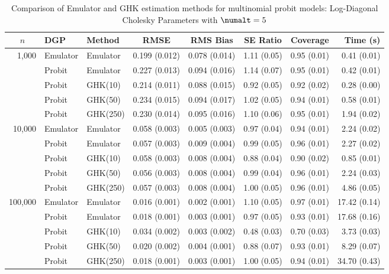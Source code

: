 \begin{table}[htbp]
\centering
\footnotesize
\begin{tabular}{@{}rllrrrrr@{}}
\toprule
\multicolumn{1}{c}{$n$} & \multicolumn{1}{l}{DGP} & \multicolumn{1}{l}{Method} & \multicolumn{1}{c}{RMSE} & \multicolumn{1}{c}{RMS Bias} & \multicolumn{1}{c}{SE Ratio} & \multicolumn{1}{c}{Coverage} & \multicolumn{1}{r}{Time (s)} \\
\midrule
\multirow{5}{*}{1,000} & Emulator & Emulator & 0.199 (0.012) & 0.078 (0.014) & 1.11 (0.05) & 0.95 (0.01) & 0.41 (0.01) \\
 & Probit & Emulator & 0.227 (0.013) & 0.094 (0.016) & 1.14 (0.07) & 0.95 (0.01) & 0.42 (0.01) \\
 & Probit & GHK(10) & 0.214 (0.011) & 0.088 (0.015) & 0.92 (0.05) & 0.92 (0.02) & 0.28 (0.00) \\
 & Probit & GHK(50) & 0.234 (0.015) & 0.094 (0.017) & 1.02 (0.05) & 0.94 (0.01) & 0.58 (0.01) \\
 & Probit & GHK(250) & 0.230 (0.014) & 0.095 (0.016) & 1.10 (0.06) & 0.95 (0.01) & 1.94 (0.02) \\
\midrule
\multirow{5}{*}{10,000} & Emulator & Emulator & 0.058 (0.003) & 0.005 (0.003) & 0.97 (0.04) & 0.94 (0.01) & 2.24 (0.02) \\
 & Probit & Emulator & 0.057 (0.003) & 0.009 (0.004) & 0.99 (0.05) & 0.96 (0.01) & 2.27 (0.02) \\
 & Probit & GHK(10) & 0.058 (0.003) & 0.008 (0.004) & 0.88 (0.04) & 0.90 (0.02) & 0.85 (0.01) \\
 & Probit & GHK(50) & 0.056 (0.003) & 0.008 (0.004) & 0.99 (0.04) & 0.96 (0.01) & 2.24 (0.03) \\
 & Probit & GHK(250) & 0.057 (0.003) & 0.008 (0.004) & 1.00 (0.05) & 0.96 (0.01) & 4.86 (0.05) \\
\midrule
\multirow{5}{*}{100,000} & Emulator & Emulator & 0.016 (0.001) & 0.002 (0.001) & 1.10 (0.05) & 0.97 (0.01) & 17.42 (0.14) \\
 & Probit & Emulator & 0.018 (0.001) & 0.003 (0.001) & 0.97 (0.05) & 0.93 (0.01) & 17.68 (0.16) \\
 & Probit & GHK(10) & 0.034 (0.002) & 0.003 (0.002) & 0.48 (0.03) & 0.70 (0.03) & 3.73 (0.03) \\
 & Probit & GHK(50) & 0.020 (0.002) & 0.004 (0.001) & 0.88 (0.07) & 0.93 (0.01) & 8.29 (0.07) \\
 & Probit & GHK(250) & 0.018 (0.001) & 0.003 (0.001) & 1.00 (0.05) & 0.94 (0.01) & 34.70 (0.43) \\
\bottomrule
\end{tabular}
\caption{Comparison of Emulator and GHK estimation methods for multinomial probit models: Log-Diagonal Cholesky Parameters with $\numalt=5$}
\label{tab:emulator_vs_ghk:5:ldiag}
\end{table}
